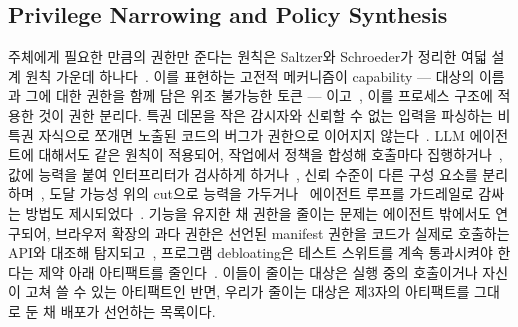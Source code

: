 \documentclass[acmsmall,screen,review,anonymous]{acmart}
\begin{document}
\subsection{Privilege Narrowing and Policy Synthesis}
\label{sec:related:narrowing}

주체에게 필요한 만큼의 권한만 준다는 원칙은 Saltzer와 Schroeder가 정리한 여덟 설계 원칙 가운데 하나다~\cite{saltzer1975protection}. 이를 표현하는 고전적 메커니즘이 capability --- 대상의 이름과 그에 대한 권한을 함께 담은 위조 불가능한 토큰 --- 이고~\cite{dennis1966programming}, 이를 프로세스 구조에 적용한 것이 권한 분리다. 특권 데몬을 작은 감시자와 신뢰할 수 없는 입력을 파싱하는 비특권 자식으로 쪼개면 노출된 코드의 버그가 권한으로 이어지지 않는다~\cite{provos2003preventing}. LLM 에이전트에 대해서도 같은 원칙이 적용되어, 작업에서 정책을 합성해 호출마다 집행하거나~\cite{shi2025progent}, 값에 능력을 붙여 인터프리터가 검사하게 하거나~\cite{debenedetti2025defeating}, 신뢰 수준이 다른 구성 요소를 분리하며~\cite{costa2025securing}, 도달 가능성 위의 cut으로 능력을 가두거나~\cite{xiong2026reachability} 에이전트 루프를 가드레일로 감싸는 방법도 제시되었다~\cite{murugan2026}. 기능을 유지한 채 권한을 줄이는 문제는 에이전트 밖에서도 연구되어, 브라우저 확장의 과다 권한은 선언된 manifest 권한을 코드가 실제로 호출하는 API와 대조해 탐지되고~\cite{cheng2026percheck}, 프로그램 debloating은 테스트 스위트를 계속 통과시켜야 한다는 제약 아래 아티팩트를 줄인다~\cite{heo2018effective, sharif2018trimmer}. 이들이 줄이는 대상은 실행 중의 호출이거나 자신이 고쳐 쓸 수 있는 아티팩트인 반면, 우리가 줄이는 대상은 제3자의 아티팩트를 그대로 둔 채 배포가 선언하는 목록이다.
\end{document}
